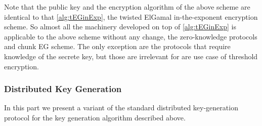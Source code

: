 Note that the public key and the encryption algorithm of the above scheme are identical to that \cref{alg:tEGinExp}, the twisted ElGamal in-the-exponent encryption scheme. So almost all the machinery  developed on top of \cref{alg:tEGinExp} is applicable to the above scheme without any change, \ie the zero-knowledge protocols and chunk EG scheme. The only exception are the protocols that require knowledge of the secrete key, but those are irrelevant for are use case of   threshold encryption.

\subsubsection{Distributed Key Generation}
In this part we present a variant of the standard distributed key-generation  protocol for the key generation algorithm \tdKg described above. 






